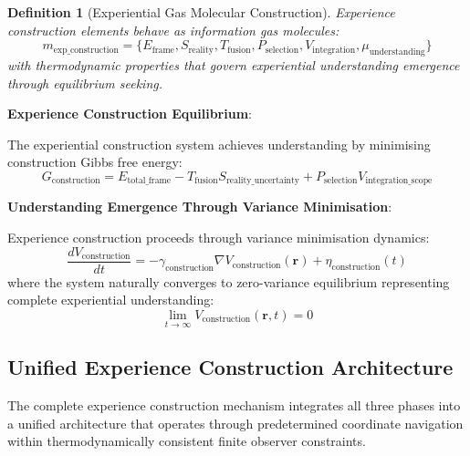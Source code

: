 \documentclass{article}
\newtheorem{definition}[theorem]{Definition}
\begin{document}
\begin{definition}[Experiential Gas Molecular Construction]
Experience construction elements behave as information gas molecules:
\begin{equation}
m_{\text{exp\_construction}} = \{E_{\text{frame}}, S_{\text{reality}}, T_{\text{fusion}}, P_{\text{selection}}, V_{\text{integration}}, \mu_{\text{understanding}}\}
\end{equation}
with thermodynamic properties that govern experiential understanding emergence through equilibrium seeking.
\end{definition}

\textbf{Experience Construction Equilibrium}:

The experiential construction system achieves understanding by minimising construction Gibbs free energy:
\begin{equation}
G_{\text{construction}} = E_{\text{total\_frame}} - T_{\text{fusion}} S_{\text{reality\_uncertainty}} + P_{\text{selection}} V_{\text{integration\_scope}}
\end{equation}

\textbf{Understanding Emergence Through Variance Minimisation}:

Experience construction proceeds through variance minimisation dynamics:
\begin{equation}
\frac{dV_{\text{construction}}}{dt} = -\gamma_{\text{construction}} \nabla V_{\text{construction}}(\mathbf{r}) + \eta_{\text{construction}}(t)
\end{equation}
where the system naturally converges to zero-variance equilibrium representing complete experiential understanding:
\begin{equation}
\lim_{t \to \infty} V_{\text{construction}}(\mathbf{r}, t) = 0
\end{equation}

\subsection{Unified Experience Construction Architecture}

The complete experience construction mechanism integrates all three phases into a unified architecture that operates through predetermined coordinate navigation within thermodynamically consistent finite observer constraints.
\end{document}
